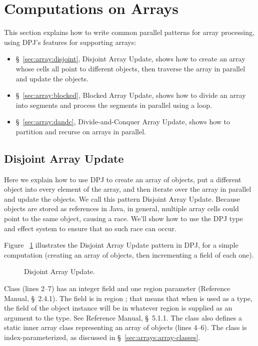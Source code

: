 \section{Computations on Arrays%
\label{sec:array}}

This section explains how to write common parallel patterns for array
processing, using DPJ's features for supporting arrays:
%
\begin{itemize}
\item \S~\ref{sec:array:disjoint}, Disjoint Array Update, shows how to
  create an array whose cells all point to different objects, then
  traverse the array in parallel and update the objects.
%
\item \S~\ref{sec:array:blocked}, Blocked Array Update, shows how to
  divide an array into segments and process the segments in parallel
  using a loop. 
%
\item \S~\ref{sec:array:dandc}, Divide-and-Conquer Array Update, shows
  how to partition and recurse on arrays in parallel.
\end{itemize}

\subsection{Disjoint Array Update%
\label{sec:array:disjoint}}

Here we explain how to use DPJ to create an array of objects, put a
different object into every element of the array, and then iterate
over the array in parallel and update the objects.  We call this
pattern Disjoint Array Update.  Because objects are stored as
references in Java, in general, multiple array cells could point to
the same object, causing a race.  We'll show how to use the DPJ type
and effect system to ensure that no such race can occur.

 Figure ~\ref{fig:array:disjoint}
illustrates the Disjoint Array Update pattern in DPJ, for a simple
computation (creating an array of objects, then incrementing a field
of each one).

\begin{figure}

\caption{Disjoint Array Update.}
\label{fig:array:disjoint}
\end{figure}


Class  (lines 2--7) has an integer field  and one
region parameter  (Reference Manual, \S~2.4.1).  The field
 is in region ; that means that when  is used
as a type, the field of the object instance will be in whatever region
is supplied as an argument to the type.  See Reference Manual,
\S~5.1.1.  The  class also defines a static inner array
class  representing an array of  objects (lines
4--6).  The  class is index-parameterized, as
discussed in \S~\ref{sec:arrays:array-classes}.

